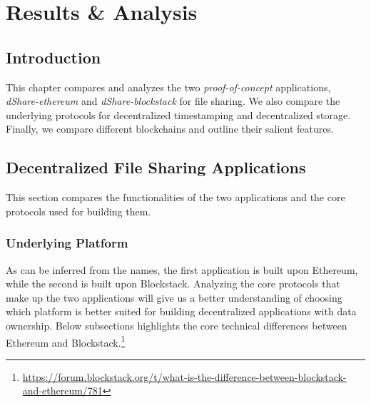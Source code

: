 \chapter{Results \& Analysis}\label{chapter::results}
\section{Introduction}
This chapter compares and analyzes the two \textit{proof-of-concept} applications, \textit{dShare-ethereum} and \textit{dShare-blockstack} for file sharing. We also compare the underlying protocols for decentralized timestamping and decentralized storage. Finally, we compare different blockchains and outline their salient features.

\section{Decentralized File Sharing Applications}
This section compares the functionalities of the two applications and the core protocols used for building them.

\subsection{Underlying Platform}
As can be inferred from the names, the first application is built upon Ethereum\cite{buterin2014ethereum}, while the second is built upon Blockstack\cite{ali2016blockstack}. Analyzing the core protocols that make up the two applications will give us a better understanding of choosing which platform is better suited for building decentralized applications with data ownership. Below subsections highlights the core technical differences between Ethereum and Blockstack.\footnote{\url{https://forum.blockstack.org/t/what-is-the-difference-between-blockstack-and-ethereum/781}}
		
